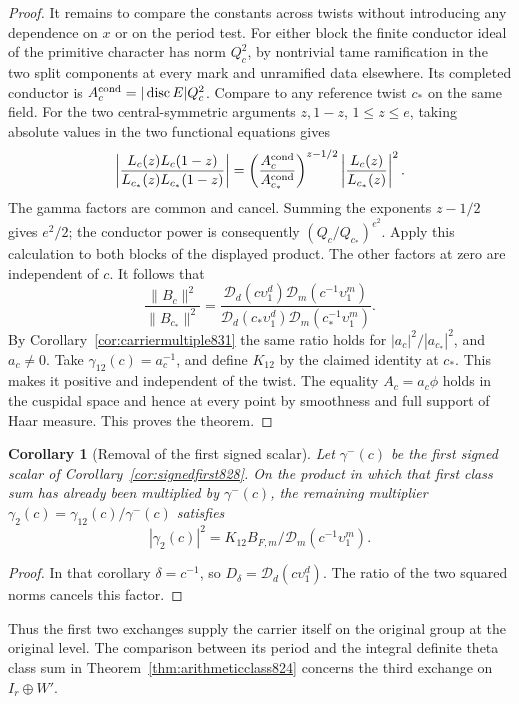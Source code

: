 \documentclass[a4paper,11pt]{article}
\newtheorem{corollary}[proposition]{Corollary}
\theoremstyle{definition}
\theoremstyle{remark}
\numberwithin{equation}{section}
\begin{document}
\begin{proof}
It remains to compare the constants across twists without
introducing any dependence on \(x\) or on the period test.
For either block the finite conductor ideal of the primitive
character has norm \(Q_c^2\), by nontrivial tame ramification
in the two split components at every mark and unramified
data elsewhere. Its completed conductor is
\(A_c^{\rm cond}=|\operatorname{disc}E|Q_c^2\).
Compare to any reference twist \(c_*\) on the same field.
For the two central-symmetric arguments \(z,1-z\),
\(1\le z\le e\), taking absolute values in the two functional
equations gives
\[
 \left|\frac{L_c(z)L_c(1-z)}{L_{c_*}(z)L_{c_*}(1-z)}\right|
 =
 \left(\frac{A_c^{\rm cond}}{A_{c_*}^{\rm cond}}\right)^{z-1/2}
 \left|\frac{L_c(z)}{L_{c_*}(z)}\right|^2 .
\]
The gamma factors are common and cancel. Summing the exponents
\(z-1/2\) gives \(e^2/2\); the conductor power is consequently
\((Q_c/Q_{c_*})^{e^2}\). Apply this calculation to both
blocks of the displayed product. The other factors at zero
are independent of \(c\). It follows that
\[
 \frac{\|B_c\|^2}{\|B_{c_*}\|^2}
  =\frac{\mathcal D_d(c\upsilon_1^d)\mathcal D_m(c^{-1}\upsilon_1^m)}
          {\mathcal D_d(c_*\upsilon_1^d)\mathcal D_m(c_*^{-1}\upsilon_1^m)} .
\]
By Corollary~\ref{cor:carriermultiple831} the same ratio
holds for \(|a_c|^2/|a_{c_*}|^2\), and \(a_c\ne0\).
Take \(\gamma_{12}(c)=a_c^{-1}\), and define \(K_{12}\)
by the claimed identity at \(c_*\). This makes it positive
and independent of the twist. The equality \(A_c=a_c\phi\)
holds in the cuspidal space and hence at every point by
smoothness and full support of Haar measure. This proves
the theorem.
\end{proof}

\begin{corollary}[Removal of the first signed scalar]
\leavevmode\label{cor:isolateexchange833}
Let \(\gamma^-(c)\) be the first signed scalar of
Corollary~\ref{cor:signedfirst828}. On the product in which
that first class sum has already been multiplied by
\(\gamma^-(c)\), the remaining multiplier
\(\gamma_2(c)=\gamma_{12}(c)/\gamma^-(c)\) satisfies
\[
       |\gamma_2(c)|^2=
          K_{12}B_{F,m}/\mathcal D_m(c^{-1}\upsilon_1^m).
\]
\end{corollary}
\begin{proof}
In that corollary \(\delta=c^{-1}\), so
\(D_\delta=\mathcal D_d(c\upsilon_1^d)\).
The ratio of the two squared norms cancels this factor.
\end{proof}

Thus the first two exchanges supply the carrier itself on
the original group at the original level. The comparison
between its period and the integral definite theta class sum
in Theorem~\ref{thm:arithmeticclass824} concerns the third
exchange on \(I_r\oplus W'\).
\clearpage
\end{document}
